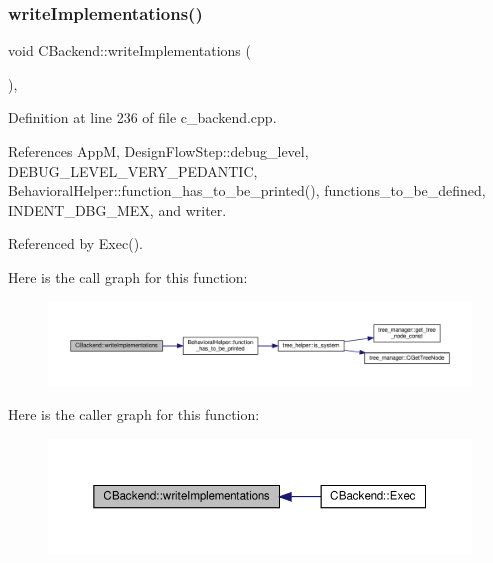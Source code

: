 \subsubsection{\texorpdfstring{write\+Implementations()}{writeImplementations()}}
{\footnotesize\ttfamily void C\+Backend\+::write\+Implementations (\begin{DoxyParamCaption}{ }\end{DoxyParamCaption})\hspace{0.3cm}{\ttfamily [protected]}, {\ttfamily [virtual]}}



Definition at line 236 of file c\+\_\+backend.\+cpp.



References AppM, Design\+Flow\+Step\+::debug\+\_\+level, D\+E\+B\+U\+G\+\_\+\+L\+E\+V\+E\+L\+\_\+\+V\+E\+R\+Y\+\_\+\+P\+E\+D\+A\+N\+T\+IC, Behavioral\+Helper\+::function\+\_\+has\+\_\+to\+\_\+be\+\_\+printed(), functions\+\_\+to\+\_\+be\+\_\+defined, I\+N\+D\+E\+N\+T\+\_\+\+D\+B\+G\+\_\+\+M\+EX, and writer.



Referenced by Exec().

Here is the call graph for this function\+:
\nopagebreak
\begin{figure}[H]
\begin{center}
\leavevmode
\includegraphics[width=350pt]{d3/de2/classCBackend_aa3c46605226753185304ebc7b9adf463_cgraph}
\end{center}
\end{figure}
Here is the caller graph for this function\+:
\nopagebreak
\begin{figure}[H]
\begin{center}
\leavevmode
\includegraphics[width=350pt]{d3/de2/classCBackend_aa3c46605226753185304ebc7b9adf463_icgraph}
\end{center}
\end{figure}
\mbox{\label{classCBackend_a4d3545310fee36bb8cfad7a893a8eb31}} 
